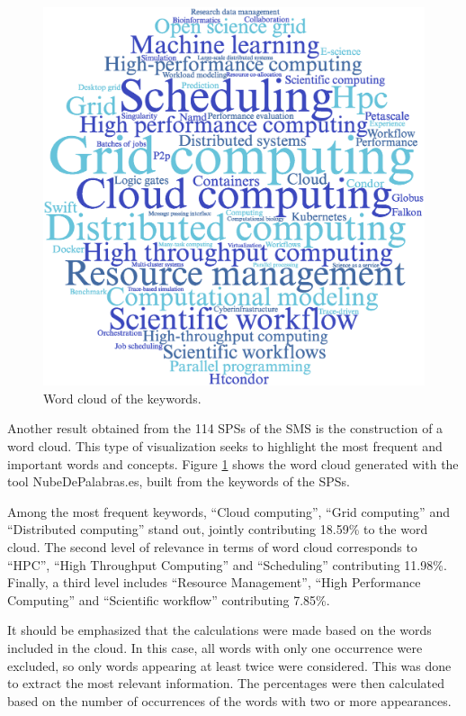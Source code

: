 \begin{figure}[ht]
	\centering
	\includegraphics[scale=0.3]{resources/figures/wordcloud.eps}
	\caption{Word cloud of the keywords.}
	\label{fig:WordCloud}
\end{figure}

Another result obtained from the 114 SPSs of the SMS is the construction of a word cloud. This type of visualization seeks to highlight the most frequent and important words and concepts. Figure \ref{fig:WordCloud} shows the word cloud generated with the tool NubeDePalabras.es, built from the keywords of the SPSs.

Among the most frequent keywords, ``Cloud computing'', ``Grid computing'' and ``Distributed computing'' stand out, jointly contributing 18.59\% to the word cloud. The second level of relevance in terms of word cloud corresponds to ``HPC'', ``High Throughput Computing'' and ``Scheduling'' contributing 11.98\%. Finally, a third level includes ``Resource Management'', ``High Performance Computing'' and ``Scientific workflow'' contributing 7.85\%.

It should be emphasized that the calculations were made based on the words included in the cloud. In this case, all words with only one occurrence were excluded, so only words appearing at least twice were considered. This was done to extract the most relevant information. The percentages were then calculated based on the number of occurrences of the words with two or more appearances.